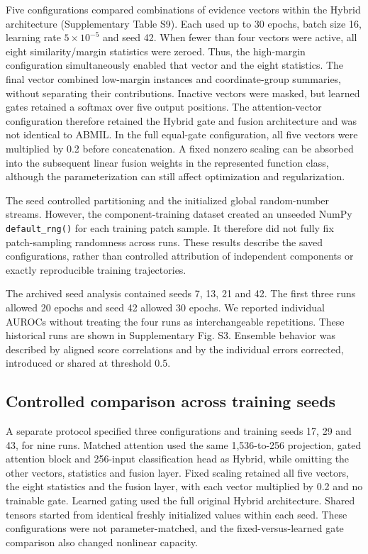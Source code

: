 Five configurations compared combinations of evidence vectors within the Hybrid architecture (Supplementary Table S9). Each used up to 30 epochs, batch size 16, learning rate $5\times10^{-5}$ and seed 42. When fewer than four vectors were active, all eight similarity/margin statistics were zeroed. Thus, the high-margin configuration simultaneously enabled that vector and the eight statistics. The final vector combined low-margin instances and coordinate-group summaries, without separating their contributions. Inactive vectors were masked, but learned gates retained a softmax over five output positions. The attention-vector configuration therefore retained the Hybrid gate and fusion architecture and was not identical to ABMIL. In the full equal-gate configuration, all five vectors were multiplied by 0.2 before concatenation. A fixed nonzero scaling can be absorbed into the subsequent linear fusion weights in the represented function class, although the parameterization can still affect optimization and regularization.

The seed controlled partitioning and the initialized global random-number streams. However, the component-training dataset created an unseeded NumPy \texttt{default\_rng()} for each training patch sample. It therefore did not fully fix patch-sampling randomness across runs. These results describe the saved configurations, rather than controlled attribution of independent components or exactly reproducible training trajectories.

The archived seed analysis contained seeds 7, 13, 21 and 42. The first three runs allowed 20 epochs and seed 42 allowed 30 epochs. We reported individual AUROCs without treating the four runs as interchangeable repetitions. These historical runs are shown in Supplementary Fig. S3. Ensemble behavior was described by aligned score correlations and by the individual errors corrected, introduced or shared at threshold 0.5.


\subsection{Controlled comparison across training seeds}

A separate protocol specified three configurations and training seeds 17, 29 and 43, for nine runs. Matched attention used the same 1,536-to-256 projection, gated attention block and 256-input classification head as Hybrid, while omitting the other vectors, statistics and fusion layer. Fixed scaling retained all five vectors, the eight statistics and the fusion layer, with each vector multiplied by 0.2 and no trainable gate. Learned gating used the full original Hybrid architecture. Shared tensors started from identical freshly initialized values within each seed. These configurations were not parameter-matched, and the fixed-versus-learned gate comparison also changed nonlinear capacity.


